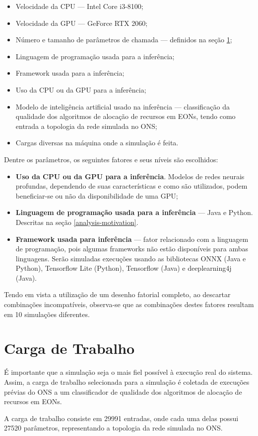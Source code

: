 \begin{itemize}
  \item Velocidade da CPU — Intel Core i3-8100;
  \item Velocidade da GPU — GeForce RTX 2060;
  \item Número e tamanho de parâmetros de chamada — definidos na seção \ref{workload};
  \item Linguagem de programação usada para a inferência;
  \item Framework usada para a inferência;
  \item Uso da CPU ou da GPU para a inferência;
  \item Modelo de inteligência artificial usado na inferência — classificação da qualidade dos algoritmos de alocação de recursos em EONs, tendo como entrada a topologia da rede simulada no ONS;
  \item Cargas diversas na máquina onde a simulação é feita.
\end{itemize}

Dentre os parâmetros, os seguintes fatores e seus níveis são escolhidos:

\begin{itemize}
  \item \textbf{Uso da CPU ou da GPU para a inferência}. Modelos de redes neurais profundas, dependendo de suas características e como são utilizados, podem beneficiar-se ou não da disponibilidade de uma GPU;
  \item \textbf{Linguagem de programação usada para a inferência} — Java e Python. Descritas na seção \ref{analysis-motivation}.
  \item \textbf{Framework usada para inferência} — fator relacionado com a linguagem de programação, pois algumas frameworks não estão disponíveis para ambas linguagens. Serão simuladas execuções usando as bibliotecas ONNX \cite{onnx2019} (Java e Python), Tensorflow Lite (Python), Tensorflow (Java) e deeplearning4j \cite{deeplearning4j} (Java).
\end{itemize}

Tendo em vista a utilização de um desenho fatorial completo, ao descartar combinações incompatíveis, observa-se que as combinações destes fatores resultam em 10 simulações diferentes.

\section{Carga de Trabalho}
\label{workload}

É importante que a simulação seja o mais fiel possível à execução real do sistema. Assim, a carga de trabalho selecionada para a simulação é coletada de execuções prévias do ONS a um classificador de qualidade dos algoritmos de alocação de recursos em EONs.

A carga de trabalho consiste em 29991 entradas, onde cada uma delas possui 27520 parâmetros, representando a topologia da rede simulada no ONS.
